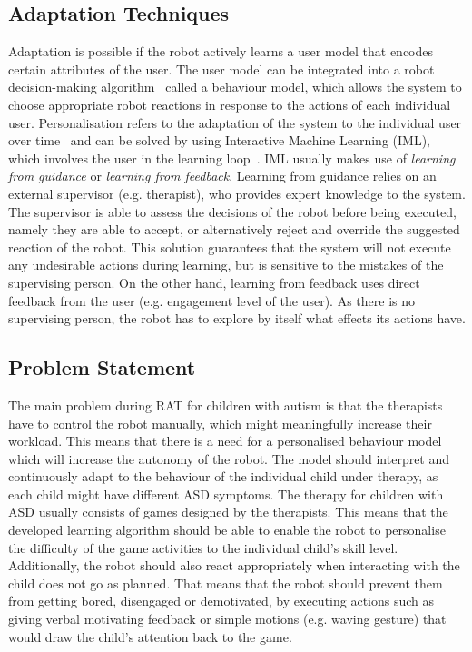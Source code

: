 \documentclass[thesis]{mas_proposal}
\begin{document}
\subsection{Adaptation Techniques}
Adaptation is possible if the robot actively learns a user model that encodes certain attributes of the user. The user model can be integrated into a robot decision-making algorithm~\cite{rossi2017user} called a behaviour model, which allows the system to choose appropriate robot reactions in response to the actions of each individual user. Personalisation refers to the adaptation of the system to the individual user over time~\cite{rossi2017user} and can be solved by using Interactive Machine Learning (IML), which involves the user in the learning loop~\cite{senft2019teaching}. IML usually makes use of \emph{learning from guidance} or \emph{learning from feedback}. Learning from guidance relies on an external supervisor (e.g. therapist), who provides expert knowledge to the system. The supervisor is able to assess the decisions of the robot before being executed, namely they are able to accept, or alternatively reject and override the suggested reaction of the robot. This solution guarantees that the system will not execute any undesirable actions during learning, but is sensitive to the mistakes of the supervising person. On the other hand, learning from feedback uses direct feedback from the user (e.g. engagement level of the user). As there is no supervising person, the robot has to explore by itself what effects its actions have. 

\subsection{Problem Statement}
The main problem during RAT for children with autism is that the therapists have to control the robot manually, which might meaningfully increase their workload. This means that there is a need for a personalised behaviour model which will increase the autonomy of the robot. The model should interpret and continuously adapt to the behaviour of the individual child under therapy, as each child might have different ASD symptoms. The therapy for children with ASD usually consists of games designed by the therapists. This means that the developed learning algorithm should be able to enable the robot to personalise the difficulty of the game activities to the individual child's skill level. Additionally, the robot should also react appropriately when interacting with the child does not go as planned. That means that the robot should prevent them from getting bored, disengaged or demotivated, by executing actions such as giving verbal motivating feedback or simple motions (e.g. waving gesture) that would draw the child’s attention back to the game.
\end{document}
